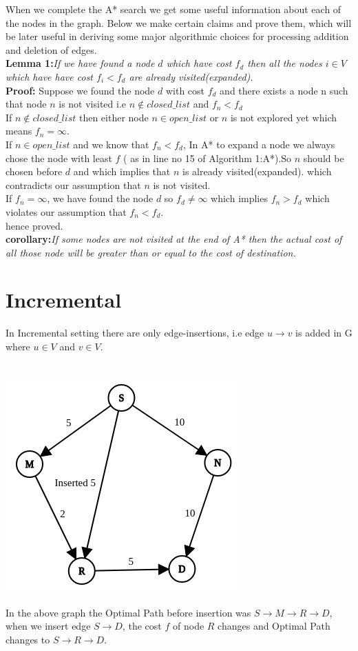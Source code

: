 \documentclass[a4paper]{article}
\begin{document}
When we complete the A* search we get some useful information about each of the nodes in the graph. Below we make certain claims and prove them, which will be later useful in deriving some major algorithmic choices for processing addition and deletion of edges.\\
\textbf{Lemma 1:}\textit{If we have found a node $d$ which have cost $f_d$ then all the nodes $i \in V$ which have have cost $f_i < f_d$ are already visited(expanded).}\\
\textbf{Proof:} Suppose we found the node $d$ with cost $f_d$ and there exists a node n such that node $n$ is not visited i.e $n \notin closed\_list$ and $f_n < f_d$\\
If $n \notin closed\_list$ then either node $n \in open\_list$ or $n$ is not explored yet which means $f_n = \infty $.\\
If $n \in open\_list$  and we know that $f_n < f_d$, In A* to expand a node we always chose the node with least $f$ ( as in line no 15 of Algorithm 1:A*).So $n$ should be chosen before $d$ and which implies that $n$ is already visited(expanded). which contradicts our assumption that $n$ is not visited.\\
If $f_n = \infty $, we have found the node $d$ so $f_d \neq \infty$ which implies $f_n > f_d$ which violates our assumption that $f_n <  f_d$.\\
hence proved.\\
\textbf{corollary:}\textit{If some nodes are not visited at the end of A* then the actual cost of all those node will be greater than or equal to the cost of destination. }

\section{Incremental}
In Incremental setting there are only edge-insertions, i.e edge $u \rightarrow v $ is added in G where $u\in V $ and $v \in V$.\\
\\
\begin{center}
    \includegraphics[scale=0.4]{img/insert1.png}
\end{center}
In the above graph the Optimal Path before insertion was $S \rightarrow M \rightarrow R \rightarrow D$, when we insert edge $S \rightarrow D$, the cost $f$ of node $R$ changes and Optimal Path changes to $S \rightarrow R \rightarrow D$.\\
\end{document}
